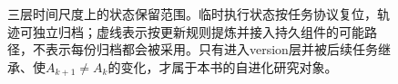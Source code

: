 \begin{figure}[htbp]
\centering

\caption{三层时间尺度上的状态保留范围。临时执行状态按任务协议复位，轨迹可独立归档；虚线表示按更新规则提炼并接入持久组件的可能路径，不表示每份归档都会被采用。只有进入version层并被后续任务继承、使$A_{k+1}\neq A_k$的变化，才属于本书的自进化研究对象。}
\label{fig:timescale}
\end{figure}
